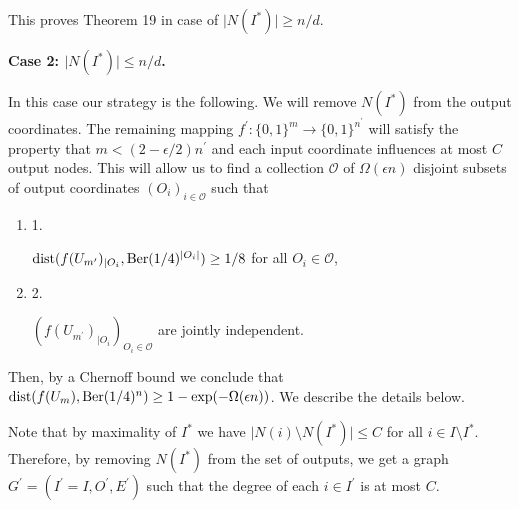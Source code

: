 This proves Theorem 19 in case of $\lvert N(I^{*})\rvert\geq n/d$.\par





\par\medskip\noindent\textbf{Case 2: $\lvert N(I^{*})\rvert\leq n/d$.}\par




In this case our strategy is the following. We will remove $N(I^{*})$ from the output coordinates. The remaining mapping $f^{\prime}\colon\{0,1\}^{m}\to\{0,1\}^{n^{\prime}}$ will satisfy the property that $m<(2-\epsilon/2)n^{\prime}$ and each input coordinate influences at most $C$ output nodes. This will allow us to find a collection $\mathcal{O}$ of $\Omega(\epsilon n)$ disjoint subsets of output coordinates $(O_{i})_{i\in\mathcal{O}}$ such that\par


\begin{enumerate}


\item[] 
1. 


$\mathrm{dist}(f(U_{m^{\prime}})_{|O_{i}},\textnormal{Ber}(1/4)^{\lvert O_{i}\rvert})\geq 1/8$ for all $O_{i}\in\mathcal{O}$,\par





\item[] 
2. 


$\left(f(U_{m^{\prime}})_{|O_{i}}\right)_{O_{i}\in\mathcal{O}}$ are jointly independent.\par





\end{enumerate}


Then, by a Chernoff bound we conclude that $\mathrm{dist}(f(U_{m}),\textnormal{Ber}(1/4)^{n})\geq 1-\exp(-\Omega(\epsilon n))$. We describe the details below.\par




Note that by maximality of $I^{*}$ we have $\lvert N(i)\setminus N(I^{*})\rvert\leq C$ for all $i\in I\setminus I^{*}$.
Therefore, by removing $N(I^{*})$ from the set of outputs, we get a graph $G^{\prime}=(I^{\prime}=I,O^{\prime},E^{\prime})$ such that the degree of each $i\in I^{\prime}$ is at most $C$.\par




